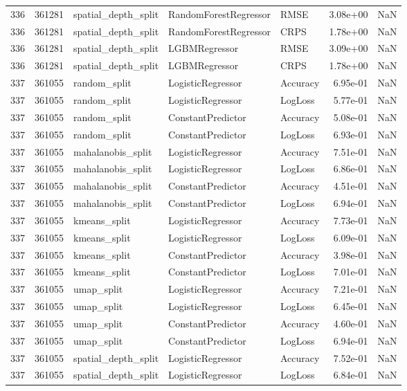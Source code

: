 \begin{tabular}{rrlllrr}
336 & 361281 & spatial\_depth\_split & RandomForestRegressor & RMSE & 3.08e+00 & NaN \\
336 & 361281 & spatial\_depth\_split & RandomForestRegressor & CRPS & 1.78e+00 & NaN \\
336 & 361281 & spatial\_depth\_split & LGBMRegressor & RMSE & 3.09e+00 & NaN \\
336 & 361281 & spatial\_depth\_split & LGBMRegressor & CRPS & 1.78e+00 & NaN \\
337 & 361055 & random\_split & LogisticRegressor & Accuracy & 6.95e-01 & NaN \\
337 & 361055 & random\_split & LogisticRegressor & LogLoss & 5.77e-01 & NaN \\
337 & 361055 & random\_split & ConstantPredictor & Accuracy & 5.08e-01 & NaN \\
337 & 361055 & random\_split & ConstantPredictor & LogLoss & 6.93e-01 & NaN \\
337 & 361055 & mahalanobis\_split & LogisticRegressor & Accuracy & 7.51e-01 & NaN \\
337 & 361055 & mahalanobis\_split & LogisticRegressor & LogLoss & 6.86e-01 & NaN \\
337 & 361055 & mahalanobis\_split & ConstantPredictor & Accuracy & 4.51e-01 & NaN \\
337 & 361055 & mahalanobis\_split & ConstantPredictor & LogLoss & 6.94e-01 & NaN \\
337 & 361055 & kmeans\_split & LogisticRegressor & Accuracy & 7.73e-01 & NaN \\
337 & 361055 & kmeans\_split & LogisticRegressor & LogLoss & 6.09e-01 & NaN \\
337 & 361055 & kmeans\_split & ConstantPredictor & Accuracy & 3.98e-01 & NaN \\
337 & 361055 & kmeans\_split & ConstantPredictor & LogLoss & 7.01e-01 & NaN \\
337 & 361055 & umap\_split & LogisticRegressor & Accuracy & 7.21e-01 & NaN \\
337 & 361055 & umap\_split & LogisticRegressor & LogLoss & 6.45e-01 & NaN \\
337 & 361055 & umap\_split & ConstantPredictor & Accuracy & 4.60e-01 & NaN \\
337 & 361055 & umap\_split & ConstantPredictor & LogLoss & 6.94e-01 & NaN \\
337 & 361055 & spatial\_depth\_split & LogisticRegressor & Accuracy & 7.52e-01 & NaN \\
337 & 361055 & spatial\_depth\_split & LogisticRegressor & LogLoss & 6.84e-01 & NaN \\

\end{tabular}
